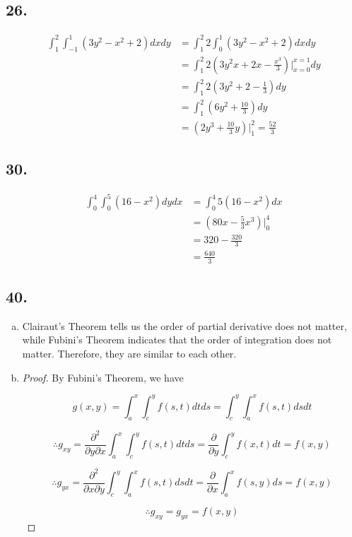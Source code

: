 \documentclass{article}
\begin{document}
  \subsection*{26. }

  $$\begin{aligned}
    \int_1^2 \int_{-1}^1 (3y^2 - x^2 + 2) dx dy &= \int_1^2 2 \int_0^1 (3y^2 - x^2 + 2) dx dy \\
    &= \int_1^2 2 (3y^2x + 2x - \frac{x^3}{3})\biggl|_{x=0}^{x=1} dy \\
    &= \int_1^2 2(3y^2+2-\frac 1 3) dy \\
    &= \int_1^2 (6y^2 + \frac{10}{3}) dy \\
    &= (2y^3 + \frac{10}{3}y)\biggl|_1^2 = \frac{52}{3}
  \end{aligned}$$

  \subsection*{30. }

  $$\begin{aligned}
    \int_0^4 \int_0^5 (16 - x^2) dy dx &= \int_0^4 5(16-x^2) dx \\
    &= (80x - \frac 5 3 x^3)\biggl|_0^4 \\
    &= 320 - \frac{320}{3} \\
    &= \frac{640}{3}
  \end{aligned}$$

  \subsection*{40. }

  \begin{enumerate}[(a)]
    \item Clairaut's Theorem tells us the order of partial derivative does not matter, while Fubini's Theorem indicates that the order of integration does not matter. Therefore, they are similar to each other.

    \item 
    \begin{proof}
      By Fubini's Theorem, we have

      $$g(x, y) = \int_a^x \int_c^y f(s, t) dt ds = \int_c^y \int_a^x f(s, t) ds dt$$

      $$\therefore g_{xy} = \frac{\partial^2}{\partial y \partial x}\int_a^x \int_c^y f(s, t) dt ds = \frac{\partial}{\partial y}\int_c^y f(x, t) dt = f(x, y)$$
      
      $$\therefore g_{yx} = \frac{\partial^2}{\partial x \partial y}\int_c^y \int_a^x f(s, t) ds dt = \frac{\partial}{\partial x}\int_a^x f(s, y) ds = f(x, y)$$

      $$\therefore g_{xy} = g_{yx} = f(x, y)$$
    \end{proof}
  \end{enumerate}
\end{document}
